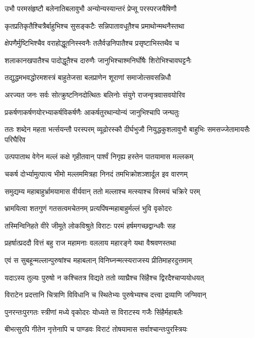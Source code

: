\twolineshloka
{उभौ परमसंहृष्टौ बलेनातिबलावुभौ}
{अन्योन्यस्यान्तरं प्रेप्सू परस्परजयैषिणौ}


\twolineshloka
{कृतप्रतिकृतैश्चित्रैर्बाहुभिश्च सुसङ्कटैः}
{सन्निपातावधूतैश्च प्रमाथोन्मथनैस्तथा}


\twolineshloka
{क्षेपणैर्मुष्टिभिश्चैव वराहोद्धूतनिस्स्वनैः}
{तलैर्वज्रनिपातैश्च प्रसृष्टाभिस्तथैव च}


\twolineshloka
{शलाकानखपातैश्च पादोद्धूतैश्च दारुणैः}
{जानुभिश्चाश्मनिर्घोषैः शिरोभिश्चावघट्टनैः}


\twolineshloka
{तद्युद्धमभवद्धोरमशस्त्रं बाहुतेजसा}
{बलप्राणेन शूराणां समाजोत्सवसन्निधौ}


\twolineshloka
{अरज्यत जनः सर्वः सोत्क्रुष्टनिनदोत्थितः}
{बलिनोः संयुगे राजन्वृत्रवासवयोरिव}


\twolineshloka
{प्रकर्षणाकर्षणयोरभ्याकर्षविकर्षणैः}
{आकर्षतुरथान्योन्यं जानुभिश्चापि जन्घतुः}


\threelineshloka
{ततः शब्देन महता भर्त्सयन्तौ परस्परम्}
{व्यूढोरस्कौ दीर्घभुजौ नियुद्धकुशलावुभौ}
{बाहुभिः समसज्जेतामायसैः परिघैरिव}


\twolineshloka
{उत्पपाताथ वेगेन मल्लं कक्षे गृहीतवान्}
{पार्श्वं निगृह्य हस्तेन पातयामास मल्लकम्}


\twolineshloka
{चकर्ष दोर्भ्यामुत्पात्य भीमो मल्लममित्रहा}
{निनदं तमभिक्रोशञ्शार्दूल इव वारणम्}


\twolineshloka
{समुद्यम्य महाबाहुर्भ्रामयामास वीर्यवान्}
{ततो मल्लाश्च मत्स्याश्च विस्मयं चक्रिरे परम्}


\twolineshloka
{भ्रामयित्वा शतगुणं गतसत्वमचेतनम्}
{प्रत्यपिंषन्महाबाहुर्मल्लं भुवि वृकोदरः}


\twolineshloka
{तस्मिन्विनिहते वीरे जीमूते लोकविश्रुते}
{विराटः परमं हर्षमगच्छद्वान्धवैः सह}


\twolineshloka
{प्रहर्षात्प्रददौ वित्तं बहु राज महामनाः}
{वललाय महारङ्गे यथा वैश्रवणस्तथा}


\twolineshloka
{एवं स सुबहून्मल्लान्पुरुषांश्च महाबलान्}
{विनिघ्नन्मत्स्यराजस्य प्रीतिमाहरदुत्तमाम्}


\twolineshloka
{यदाऽस्य तुल्यः पुरुषो न कश्चितत्र विद्यते}
{ततो व्याघ्रैश्च सिंहैश्च द्विरदैश्चाप्ययोधयत्}


\twolineshloka
{विराटेन प्रदत्तानि चित्राणि विविधानि च}
{स्थितेभ्यः पुरुषेभ्यश्च दत्त्वा द्रव्याणि जग्मिवान्}


\twolineshloka
{पुनरन्तःपुरगतः स्त्रीणां मध्ये वृकोदरः}
{योध्यते स विराटस्य गजैः सिंहैर्महाबलैः}


\twolineshloka
{बीभत्सुरपि गीतेन नृत्तेनापि च पाण्डवः}
{विराटं तोषयामास सर्वाश्चान्तःपुरस्त्रियः}


